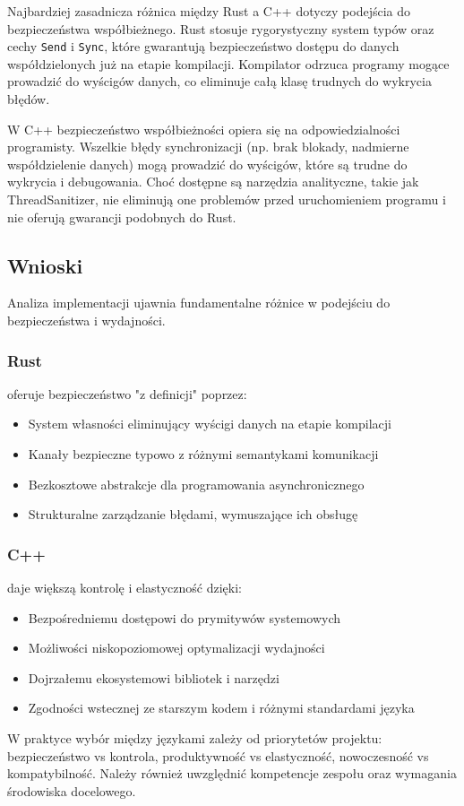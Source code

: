 Najbardziej zasadnicza różnica między Rust a C++ dotyczy podejścia do bezpieczeństwa współbieżnego. Rust stosuje rygorystyczny system typów oraz cechy \texttt{Send} i \texttt{Sync}, które gwarantują bezpieczeństwo dostępu do danych współdzielonych już na etapie kompilacji. Kompilator odrzuca programy mogące prowadzić do wyścigów danych, co eliminuje całą klasę trudnych do wykrycia błędów.

W C++ bezpieczeństwo współbieżności opiera się na odpowiedzialności programisty. Wszelkie błędy synchronizacji (np. brak blokady, nadmierne współdzielenie danych) mogą prowadzić do wyścigów, które są trudne do wykrycia i debugowania. Choć dostępne są narzędzia analityczne, takie jak ThreadSanitizer, nie eliminują one problemów przed uruchomieniem programu i nie oferują gwarancji podobnych do Rust.



\subsection{Wnioski}

Analiza implementacji ujawnia fundamentalne różnice w podejściu do bezpieczeństwa i wydajności.

\subsubsection{Rust} oferuje bezpieczeństwo "z definicji" poprzez:
\begin{itemize}
    \item System własności eliminujący wyścigi danych na etapie kompilacji
    \item Kanały bezpieczne typowo z różnymi semantykami komunikacji
    \item Bezkosztowe abstrakcje  dla programowania asynchronicznego
    \item Strukturalne zarządzanie błędami, wymuszające ich obsługę
\end{itemize}

\subsubsection{C++} daje większą kontrolę i elastyczność dzięki:
\begin{itemize}
    \item Bezpośredniemu dostępowi do prymitywów systemowych
    \item Możliwości niskopoziomowej optymalizacji wydajności
    \item Dojrzałemu ekosystemowi bibliotek i narzędzi
    \item Zgodności wstecznej ze starszym kodem i różnymi standardami języka
\end{itemize}

W praktyce wybór między językami zależy od priorytetów projektu: bezpieczeństwo vs kontrola, produktywność vs elastyczność, nowoczesność vs kompatybilność. Należy również uwzględnić kompetencje zespołu oraz wymagania środowiska docelowego.


